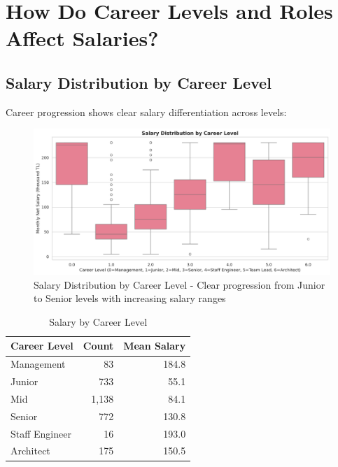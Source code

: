 \documentclass[12pt,a4paper]{article}
\begin{document}
\section{How Do Career Levels and Roles Affect Salaries?}

\subsection{Salary Distribution by Career Level}
Career progression shows clear salary differentiation across levels:

\begin{figure}[H]
    \begin{minipage}{\textwidth}
        \centering
        \includegraphics[width=\textwidth]{figures/boxplot_seniority.png}
        \caption{Salary Distribution by Career Level - Clear progression from Junior to Senior levels with increasing salary ranges}
        \label{fig:seniority_boxplot}
    \end{minipage}
\end{figure}

\begin{table}[H]
    \begin{minipage}{\textwidth}
        \centering
        \begin{tabular}{lrr}
            \toprule
            \textbf{Career Level} & \textbf{Count} & \textbf{Mean Salary} \\
            \midrule
            Management & 83 & 184.8 \\
            Junior & 733 & 55.1 \\
            Mid & 1,138 & 84.1 \\
            Senior & 772 & 130.8 \\
            Staff Engineer & 16 & 193.0 \\
            Architect & 175 & 150.5 \\
            \bottomrule
        \end{tabular}
        \caption{Salary by Career Level}
        \label{tab:seniority_table}
    \end{minipage}
\end{table}
\end{document}
